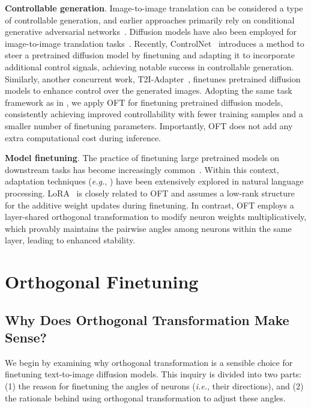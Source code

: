 \textbf{Controllable generation}. Image-to-image translation can be considered a type of controllable generation, and earlier approaches primarily rely on conditional generative adversarial networks~\cite{isola2017image,zhu2017toward,wang2018high,park2019semantic,choi2018stargan}. Diffusion models have also been employed for image-to-image translation tasks~\cite{saharia2022palette,voynov2022sketch,wang2022pretraining}. Recently, ControlNet~\cite{zhang2023adding} introduces a method to steer a pretrained diffusion model by finetuning and adapting it to incorporate additional control signals, achieving notable success in controllable generation. Similarly, another concurrent work, T2I-Adapter~\cite{mou2023t2i}, finetunes pretrained diffusion models to enhance control over the generated images. Adopting the same task framework as in \cite{zhang2023adding,mou2023t2i}, we apply OFT for finetuning pretrained diffusion models, consistently achieving improved controllability with fewer training samples and a smaller number of finetuning parameters. Importantly, OFT does not add any extra computational cost during inference.

\textbf{Model finetuning}. The practice of finetuning large pretrained models on downstream tasks has become increasingly common~\cite{devlin2018bert,brown2020language,he2022masked}. Within this context, adaptation techniques (\emph{e.g.}, \cite{hulora2022,houlsby2019parameter,pfeiffer2020adapterfusion}) have been extensively explored in natural language processing. LoRA~\cite{hulora2022} is closely related to OFT and assumes a low-rank structure for the additive weight updates during finetuning. In contrast, OFT employs a layer-shared orthogonal transformation to modify neuron weights multiplicatively, which provably maintains the pairwise angles among neurons within the same layer, leading to enhanced stability.

\section{Orthogonal Finetuning}

\subsection{Why Does Orthogonal Transformation Make Sense?}

We begin by examining why orthogonal transformation is a sensible choice for finetuning text-to-image diffusion models. This inquiry is divided into two parts: (1) the reason for finetuning the angles of neurons (\emph{i.e.}, their directions), and (2) the rationale behind using orthogonal transformation to adjust these angles.

